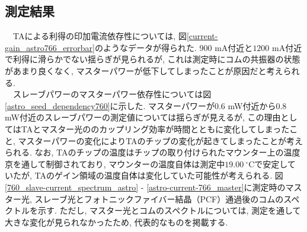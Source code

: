 \documentclass[uplatex, dvipdfmx, a4paper, report, papersize, 11pt]{jsbook}
\begin{document}
\subsection{測定結果}
　TAによる利得の印加電流依存性については, 図\ref{current-gain_astro766_errorbar}のようなデータが得られた. $900$ mA付近と$1200$ mA付近で利得に滑らかでない揺らぎが見られるが, これは測定時にコムの共振器の状態があまり良くなく, マスターパワーが低下してしまったことが原因だと考えられる. \\
　スレーブパワーのマスターパワー依存性については図\ref{astro_seed_dependency760}に示した. マスターパワーが$0.6$ mW付近から$0.8$ mW付近のスレーブパワーの測定値については揺らぎが見えるが, この理由としてはTAとマスター光ののカップリング効率が時間とともに変化してしまったこと, マスターパワーの変化によりTAのチップの変化が起きてしまったことが考えられる. なお, TAのチップの温度はチップの取り付けられたマウンター上の温度京を通して制御されており, マウンターの温度自体は測定中$19.00\ ^\circ$Cで安定していたが, TAのゲイン領域の温度自体は変化していた可能性が考えられる. 図\ref{760_slave-current_spectrum_astro} - \ref{astro-current-766_master}に測定時のマスター光, スレーブ光とフォトニックファイバー結晶（PCF）通過後のコムのスペクトルを示す. ただし, マスター光とコムのスペクトルについては, 測定を通して大きな変化が見られなかったため, 代表的なものを掲載する.
\end{document}
